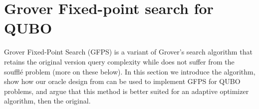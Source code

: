 \documentclass[reqno,10pt]{amsart}
\numberwithin{equation}{section}                %
\begin{document}
\bigskip

\section{Grover Fixed-point search for QUBO}
\label{sec:grover_for_qubo}

Grover Fixed-Point Search (GFPS) \cite{yoder_fixed_2014} is a variant of Grover's search algorithm that retains the original version query complexity while does not suffer from the souffl\'e problem (more on these below). In this section we introduce the algorithm, show how our oracle design from  can be used to implement GFPS for QUBO problems, and argue that this method is better suited for an adaptive optimizer algorithm, then the original.

\smallskip
\end{document}
